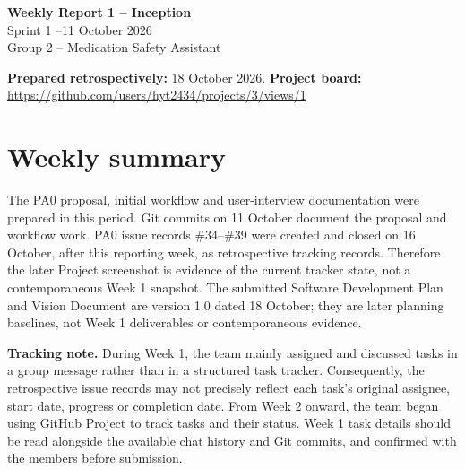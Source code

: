 

\begin{center}
{\Large\bfseries Weekly Report 1 -- Inception}\\[3pt]
Sprint 1 --11 October 2026\\
Group 2 -- Medication Safety Assistant
\end{center}
\textbf{Prepared retrospectively:} 18 October 2026. \textbf{Project board:} \url{https://github.com/users/hyt2434/projects/3/views/1}

\section{Weekly summary}
The PA0 proposal, initial workflow and user-interview documentation were prepared in this period. Git commits on 11 October document the proposal and workflow work. PA0 issue records \#34--\#39 were created and closed on 16 October, after this reporting week, as retrospective tracking records. Therefore the later Project screenshot is evidence of the current tracker state, not a contemporaneous Week 1 snapshot. The submitted Software Development Plan and Vision Document are version 1.0 dated 18 October; they are later planning baselines, not Week 1 deliverables or contemporaneous evidence.

\textbf{Tracking note.} During Week 1, the team mainly assigned and discussed tasks in a group message rather than in a structured task tracker. Consequently, the retrospective issue records may not precisely reflect each task's original assignee, start date, progress or completion date. From Week 2 onward, the team began using GitHub Project to track tasks and their status. Week 1 task details should be read alongside the available chat history and Git commits, and confirmed with the members before submission.

